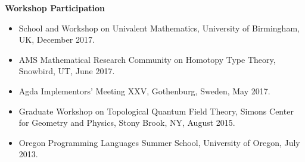 \documentclass[11pt]{article}
\begin{document}
  
  {\large \textbf{Workshop Participation}}
  \begin{itemize}
    \item[] School and Workshop on Univalent Mathematics, University of Birmingham, UK, December 2017.
    
    \item[] AMS Mathematical Research Community on Homotopy Type Theory, Snowbird, UT, June 2017.

    \item[] Agda Implementors' Meeting XXV, Gothenburg, Sweden, May 2017.
      
    \item[] Graduate Workshop on Topological Quantum Field Theory, Simons Center for Geometry and Physics, Stony Brook, NY, August 2015.

    \item[] Oregon Programming Languages Summer School, University of Oregon, July 2013.
  \end{itemize}

  
  
  
\end{document}

